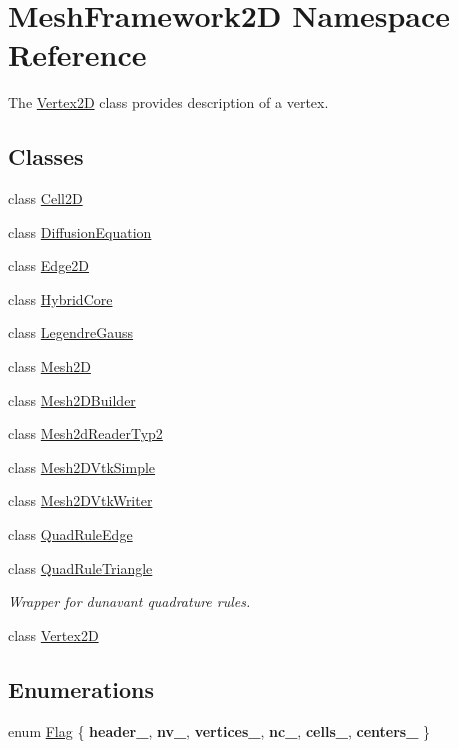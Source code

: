 \hypertarget{namespaceMeshFramework2D}{}\section{Mesh\+Framework2D Namespace Reference}
\label{namespaceMeshFramework2D}


The \hyperlink{classMeshFramework2D_1_1Vertex2D}{Vertex2D} class provides description of a vertex.  


\subsection*{Classes}
\begin{DoxyCompactItemize}
\item 
class \hyperlink{classMeshFramework2D_1_1Cell2D}{Cell2D}
\item 
class \hyperlink{classMeshFramework2D_1_1DiffusionEquation}{Diffusion\+Equation}
\item 
class \hyperlink{classMeshFramework2D_1_1Edge2D}{Edge2D}
\item 
class \hyperlink{classMeshFramework2D_1_1HybridCore}{Hybrid\+Core}
\item 
class \hyperlink{classMeshFramework2D_1_1LegendreGauss}{Legendre\+Gauss}
\item 
class \hyperlink{classMeshFramework2D_1_1Mesh2D}{Mesh2D}
\item 
class \hyperlink{classMeshFramework2D_1_1Mesh2DBuilder}{Mesh2\+D\+Builder}
\item 
class \hyperlink{classMeshFramework2D_1_1Mesh2dReaderTyp2}{Mesh2d\+Reader\+Typ2}
\item 
class \hyperlink{classMeshFramework2D_1_1Mesh2DVtkSimple}{Mesh2\+D\+Vtk\+Simple}
\item 
class \hyperlink{classMeshFramework2D_1_1Mesh2DVtkWriter}{Mesh2\+D\+Vtk\+Writer}
\item 
class \hyperlink{classMeshFramework2D_1_1QuadRuleEdge}{Quad\+Rule\+Edge}
\item 
class \hyperlink{classMeshFramework2D_1_1QuadRuleTriangle}{Quad\+Rule\+Triangle}
\begin{DoxyCompactList}\small\item\em Wrapper for dunavant quadrature rules. \end{DoxyCompactList}\item 
class \hyperlink{classMeshFramework2D_1_1Vertex2D}{Vertex2D}
\end{DoxyCompactItemize}
\subsection*{Enumerations}
\begin{DoxyCompactItemize}
\item 
enum \hyperlink{namespaceMeshFramework2D_ace0d6501a2c8c59dad381aa35f1f4ed4}{Flag} \{ \newline
{\bfseries header\+\_\+}, 
{\bfseries nv\+\_\+}, 
{\bfseries vertices\+\_\+}, 
{\bfseries nc\+\_\+}, 
\newline
{\bfseries cells\+\_\+}, 
{\bfseries centers\+\_\+}
 \}
\end{DoxyCompactItemize}


